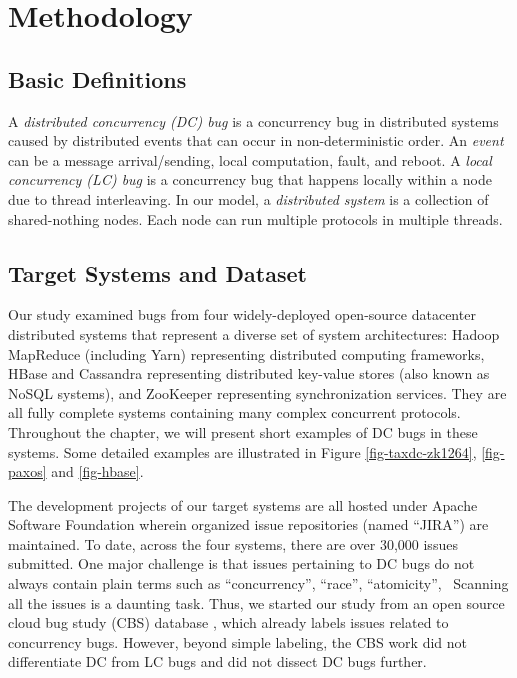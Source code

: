 

\section{Methodology}
\label{sec-met}



\vfifteen
\subsection{Basic Definitions}
\label{met-def}

A {\em distributed concurrency (DC) bug} is a 
concurrency bug in distributed
systems caused by distributed events that can occur in
non-deterministic order.  An {\em event} can be a message arrival/sending, 
local computation, fault, and reboot.
%
A {\em local concurrency (LC) bug} is a 
concurrency bug that happens locally
within a node due to thread interleaving.
%
In our model, a {\em distributed system} is a collection of
shared-nothing nodes.  Each node can run multiple protocols in
multiple threads.
%


\subsection{Target Systems and Dataset}
\label{met-data}


Our study examined bugs from four widely-deployed
open-source datacenter distributed
systems that represent a diverse set of system architectures: Hadoop
MapReduce (including Yarn) \cite{HadoopWeb} representing distributed
computing frameworks, HBase \cite{HBaseWeb} and Cassandra
\cite{CassandraWeb} representing distributed key-value stores (also
known as NoSQL systems), and ZooKeeper \cite{ZooKeeperWeb}
representing synchronization services.
%
They are all fully complete systems containing many complex concurrent
protocols.  Throughout the chapter, we will present short examples of DC
bugs in these systems.  Some detailed examples are illustrated in Figure
\ref{fig-taxdc-zk1264}, \ref{fig-paxos} and \ref{fig-hbase}.

The development projects of our target systems are all hosted under
Apache Software Foundation wherein organized issue repositories (named
``JIRA'') are maintained.  To date, across the four systems, there are
over 30,000 issues submitted.  One major challenge is that issues
pertaining to DC bugs do not always contain plain terms such as
``concurrency'', ``race'', ``atomicity'', \etc\ Scanning all the
issues is a daunting task.  Thus, we started our study from an open
source cloud bug study (CBS) database \cite{CBSWeb}, which already
labels issues related to concurrency bugs.  However, beyond simple
labeling, the CBS work did not differentiate DC from LC bugs and did
not dissect DC bugs further.

